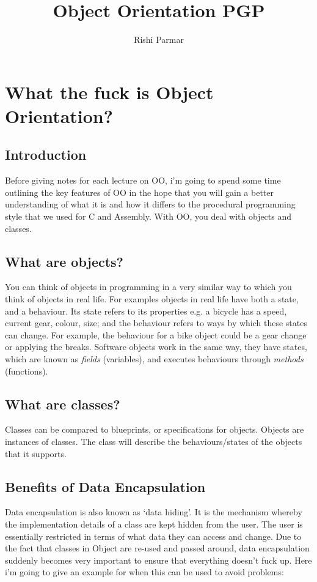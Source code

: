 \documentclass{article}
\begin{document}
\title{Object Orientation PGP}
\author{Rishi Parmar}

\maketitle
\newpage
{}
\hypertarget{MyToc}{}
\tableofcontents
\newpage


\section{What the fuck is Object Orientation?}
\subsection{Introduction}
Before giving notes for each lecture on OO, i'm going to spend some time outlining the key features of OO
in the hope that you will gain a better understanding of what it is and how it differs to the procedural
programming style that we used for C and Assembly. With OO, you deal with objects and classes.

\subsection{What are objects?}
You can think of objects in programming in a very similar way to which you think of objects in real life. 
For examples objects in real life have both a state, and a behaviour. Its state refers to its properties
e.g. a bicycle has a speed, current gear, colour, size; and the behaviour refers to ways by which these 
states can change. For example, the behaviour for a bike object could be a gear change or applying the 
breaks. Software objects work in the same way, they have states, which are known as \emph{fields} (variables), 
and executes behaviours through \emph{methods} (functions).

\subsection{What are classes?}

Classes can be compared to blueprints, or specifications for objects. Objects are instances of classes. The class will describe the behaviours/states of the objects that it supports.

\subsection{Benefits of Data Encapsulation}
Data encapsulation is also known as `data hiding'. It is the mechanism whereby the implementation details 
of a class are kept hidden from the user. The user is essentially restricted in terms of what data they
can access and change. Due to the fact that classes in Object are re-used and passed around, data encapsulation
suddenly becomes very important to ensure that everything doesn't fuck up. Here i'm going to give an example for
when this can be used to avoid problems:
\end{document}

